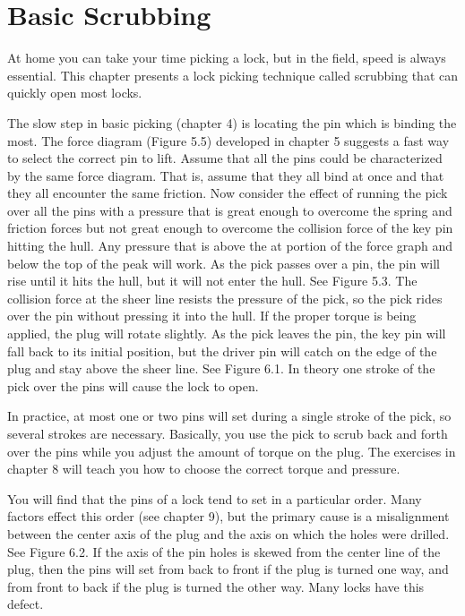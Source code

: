 \chapter{Basic Scrubbing}
At home you can take your time picking a lock, but in the field, speed is always essential.
This chapter presents a lock picking technique called scrubbing that can quickly open most
locks.

The slow step in basic picking (chapter 4) is locating the pin which is binding the most.
The force diagram (Figure 5.5) developed in chapter 5 suggests a fast way to select the correct
pin to lift. Assume that all the pins could be characterized by the same force diagram. That
is, assume that they all bind at once and that they all encounter the same friction. Now
consider the effect of running the pick over all the pins with a pressure that is great enough
to overcome the spring and friction forces but not great enough to overcome the collision
force of the key pin hitting the hull. Any pressure that is above the at portion of the force graph 
and below the top of the peak will work. As the pick passes over a pin, the pin will rise until it hits 
the hull, but it will not enter the hull. See Figure 5.3. The collision force at the sheer line resists 
the pressure of the pick, so the pick rides over the pin without pressing it into the hull. 
If the proper torque is being applied, the plug will rotate slightly. As the pick leaves the pin, 
the key pin will fall back to its initial position, but the driver pin will catch on the edge of 
the plug and stay above the sheer line. See Figure 6.1. In theory one stroke of the pick over the pins 
will cause the lock to open.

In practice, at most one or two pins will set during a single stroke of the pick, so several
strokes are necessary. Basically, you use the pick to scrub back and forth over the pins while
you adjust the amount of torque on the plug. The exercises in chapter 8 will teach you how
to choose the correct torque and pressure.

You will find that the pins of a lock tend to set in a particular order. Many factors effect
this order (see chapter 9), but the primary cause is a misalignment between the center axis
of the plug and the axis on which the holes were drilled. See Figure 6.2. If the axis of the
pin holes is skewed from the center line of the plug, then the pins will set from back to front
if the plug is turned one way, and from front to back if the plug is turned the other way.
Many locks have this defect.


